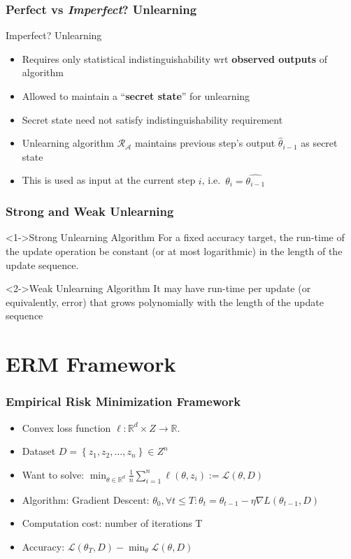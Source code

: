 \documentclass[pdf]{beamer}
\begin{document}
\begin{frame}
    \frametitle{Perfect vs \textit{Imperfect}? Unlearning}
    Imperfect? Unlearning
    \begin{itemize}
        \item Requires only statistical indistinguishability wrt \textbf{observed outputs} of algorithm
        \item Allowed to maintain a ``\textbf{secret state}'' for unlearning
        \item Secret state need not satisfy indistinguishability requirement
        \item Unlearning algorithm $\mathcal{R}_{\mathcal{A}}$ maintains previous step's output $\hat{\theta}_{i-1}$ as secret state
        \item This is used as input at the current step $i$, i.e.\ $\theta_{i}=\hat{\theta_{i-1}}$
    \end{itemize}
\end{frame}

\begin{frame}
    \frametitle{Strong and Weak Unlearning}
    \begin{block}<1->{Strong Unlearning Algorithm}
        For a fixed accuracy target,
        the run-time of the update operation be constant (or at most logarithmic) 
        in the length of the update sequence.
    \end{block}
    \begin{block}<2->{Weak Unlearning Algorithm}
        It may have run-time per update (or equivalently, error)
        that grows polynomially with the length of the update sequence
    \end{block}
    

\end{frame}

\section{ERM Framework}
\begin{frame}
    \frametitle{Empirical Risk Minimization Framework}
    \begin{itemize}
        \item Convex loss function $\ell: \mathbb{R}^{d} \times Z \rightarrow \mathbb{R}$.
        \item Dataset $D=\left\{z_{1}, z_{2}, \ldots, z_{n}\right\} \in Z^{n}$
        \item Want to solve: $\min _{\theta \in \mathbb{R}^{d}} \frac{1}{n} \sum_{i=1}^{n} \ell\left(\theta, z_{i}\right):=\mathcal{L}(\theta, D)$
        \item Algorithm: Gradient Descent: $\theta_{0}, \forall t \leq T: \theta_{t}=\theta_{t-1}-\eta \nabla L\left(\theta_{t-1}, D\right)$
        \item Computation cost: number of iterations T
        \item Accuracy: $\mathcal{L}\left(\theta_{T}, D\right)-\min _{\theta} \mathcal{L}(\theta, D)$
    \end{itemize}
    

\end{frame}
\end{document}
